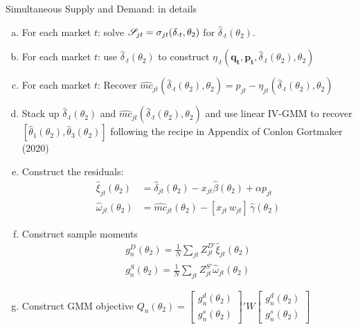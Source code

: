 \documentclass[aspectratio=169,10pt]{beamer}
\begin{document}
\begin{frame}{Simultaneous Supply and Demand: in details}
\footnotesize
\begin{enumerate}[(a)]
\item For each market $t$: solve $\mathscr{S}_{jt} = \sigma_{jt}(\delta_{\cdot t},\theta_2)$ for $\widehat{\delta}_{\cdot t}(\theta_2)$.
\item For each market $t$: use $\widehat{\delta}_{\cdot t}(\theta_2)$ to construct $\eta_{\cdot 
t}(\symbf{q_t},\symbf{p_t},\widehat{\delta}_{\cdot t}(\theta_2),\theta_2)$
\item For each market $t$: Recover $\widehat{mc}_{jt}(\widehat{\delta}_{\cdot t}(\theta_2),\theta_2) = p_{jt} - \eta_{jt}(\widehat{\delta}_{\cdot t}(\theta_2),\theta_2)$
\item Stack up $\widehat{\delta}_{\cdot t}(\theta_2)$ and $\widehat{mc}_{jt}(\widehat{\delta}_{\cdot t}(\theta_2),\theta_2)$ and use linear IV-GMM to recover $[\widehat{\theta}_1(\theta_2), \widehat{\theta}_3(\theta_2) ]$ following the recipe in Appendix of Conlon Gortmaker (2020)
\item Construct the residuals:
\begin{align*}
\nonumber    \widehat{\xi}_{jt}(\theta_2) &= \widehat{\delta}_{jt}(\theta_2) -  x_{jt} \widehat{\beta}(\theta_2) + \alpha p_{jt}\\
    \widehat{\omega}_{jt}(\theta_2) &= \widehat{mc}_{jt}(\theta_2) -  [x_{jt}\, w_{jt}]\, \widehat{\gamma}(\theta_2)
\end{align*}
\item Construct sample moments
\begin{align*}
\nonumber g_n^D(\theta_2)=\frac{1}{N} \sum_{jt} Z_{jt}^{D\prime} \widehat{\xi}_{jt}(\theta_2)\\
 g_n^S(\theta_2)=\frac{1}{N} \sum_{jt} Z_{jt}^{S \prime} \widehat{\omega}_{jt}(\theta_2)
\end{align*}
\item Construct GMM objective $Q_n(\theta_2)= \left[ {\begin{array}{c} g_n^d(\theta_2) \\ g_n^s(\theta_2) \end{array} } \right]' W  \left[ {\begin{array}{c} g_n^d(\theta_2) \\ g_n^s(\theta_2) \end{array} } \right] $
\end{enumerate}
\end{frame}
\end{document}

